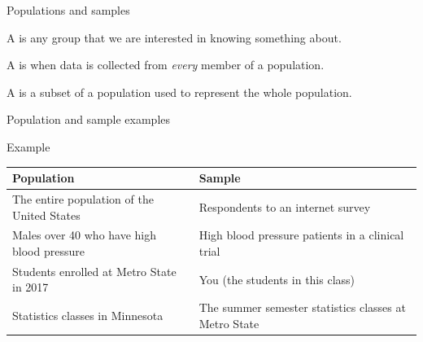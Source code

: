 \documentclass[xcolor=table, handout]{beamer}
\begin{document}
\begin{frame}{Populations and samples}

\begin{block}{}
\large A  is any group that we are interested in knowing something about.
\end{block}

\pause
\begin{block}{}
\large A  is when data is collected from \emph{every} member of a population.
\end{block}

\pause
\begin{block}{}
\large A  is a subset of a population used to represent the whole population.
\end{block}

\end{frame}


\begin{frame}{Population and sample examples}

\begin{exampleblock}{Example}
\begin{center}
\begin{tabular}{p{1.8in} | p{1.8in} }
Population & Sample\\
\hline
The entire population of the United States & Respondents to an internet survey\pause\\ 
Males over 40 who have high blood pressure & High blood pressure patients in a clinical trial\pause\\

Students enrolled at Metro State in 2017 & You (the students in this class)\pause\\
Statistics classes in Minnesota & The summer semester statistics classes at Metro State\\
\end{tabular}
\end{center}
\end{exampleblock}

\end{frame}
\end{document}
